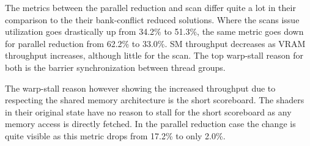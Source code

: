 \documentclass[m,times]{cgMA}
\begin{document}
The metrics between the parallel reduction and scan differ quite a lot in their comparison to the their bank-conflict reduced solutions. Where the scans issue utilization goes drastically up from 34.2\% to 51.3\%, the same metric goes down for parallel reduction from 62.2\% to 33.0\%. SM throughput decreases as VRAM throughput increases, although little for the scan. The top warp-stall reason for both is the barrier synchronization between thread groups.

The warp-stall reason however showing the increased throughput due to respecting the shared memory architecture is the short scoreboard. The shaders in their original state have no reason to stall for the short scoreboard as any memory access is directly fetched. In the parallel reduction case the change is quite visible as this metric drops from 17.2\% to only 2.0\%.
\end{document}

